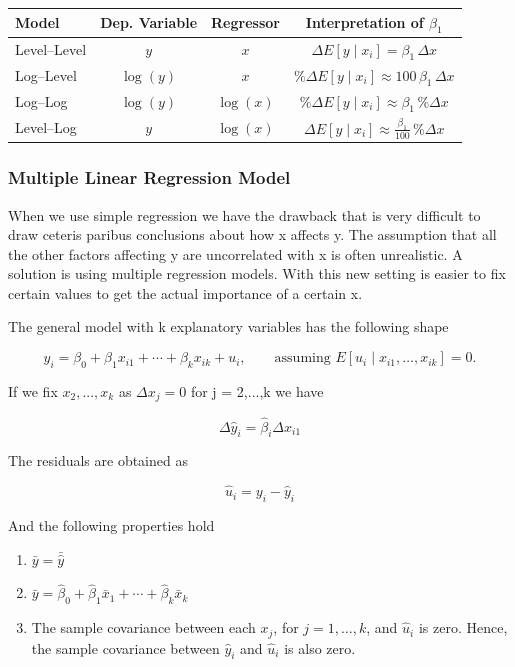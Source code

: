 \begin{table}[h!]
\centering
\begin{tabular}{lccc}
\hline
\textbf{Model} & \textbf{Dep. Variable} & \textbf{Regressor} & \textbf{Interpretation of $\beta_1$} \\
\hline
Level--Level & $y$ & $x$ &
$\Delta E[y \mid x_i] = \beta_1 \,\Delta x$ \\[6pt]

Log--Level & $\log(y)$ & $x$ &
$\%\Delta E[y \mid x_i] \approx 100\,\beta_1\,\Delta x$ \\[6pt]

Log--Log & $\log(y)$ & $\log(x)$ &
$\%\Delta E[y \mid x_i] \approx \beta_1 \,\%\Delta x$ \\[6pt]

Level--Log & $y$ & $\log(x)$ &
$\Delta E[y \mid x_i] \approx \frac{\beta_1}{100}\,\%\Delta x$ \\
\hline
\end{tabular}
\end{table}

\subsubsection{Multiple Linear Regression Model}

When we use simple regression we have the drawback that is very difficult to draw ceteris paribus conclusions about how x affects y.
The assumption that all the other factors affecting y are uncorrelated with x is often unrealistic. A solution is using multiple regression models. 
With this new setting is easier to fix certain values to get the actual importance of a certain x.

The general model with k explanatory variables has the following shape

\[
y_i = \beta_0 + \beta_1 x_{i1} + \cdots + \beta_k x_{ik} + u_i,
\qquad
\text{assuming } E[u_i \mid x_{i1},\ldots,x_{ik}] = 0.
\]

If we fix $x_2,...,x_k$ as $\Delta x_j = 0$ for j = 2,...,k we have

\[
\Delta\hat{y}_i = \hat{\beta}_i \Delta x_{i1}
\]

The residuals are obtained as 

\[
\hat{u}_i = y_i - \hat{y}_i
\]

And the following properties hold

\begin{enumerate}
    \item $\bar{y} = \bar{\hat{y}}$

    \item $\bar{y} = \hat{\beta}_0 
        + \hat{\beta}_1 \bar{x}_1 
        + \cdots 
        + \hat{\beta}_k \bar{x}_k$

    \item The sample covariance between each $x_j$, for $j = 1,\ldots,k$, 
          and $\hat{u}_i$ is zero. Hence, the sample covariance between 
          $\hat{y}_i$ and $\hat{u}_i$ is also zero.
\end{enumerate}

